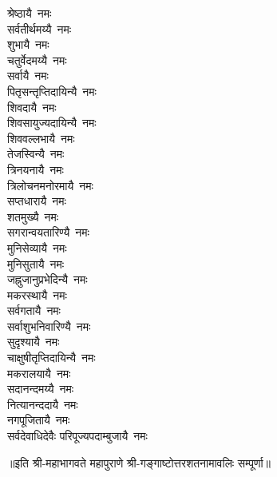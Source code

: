 \begin{multicols}{2}
\begin{flushleft}
श्रेष्ठायै~नमः\\
सर्वतीर्थमय्यै~नमः\\
शुभायै~नमः\\
चतुर्वेदमय्यै~नमः\\
सर्वायै~नमः\\
पितृसन्तृप्तिदायिन्यै~नमः\\
शिवदायै~नमः\\
शिवसायुज्यदायिन्यै~नमः\\
शिववल्लभायै~नमः\\
तेजस्विन्यै~नमः\hfill{}\\
त्रिनयनायै~नमः\\
त्रिलोचनमनोरमायै~नमः\\
सप्तधारायै~नमः\\
शतमुख्यै~नमः\\
सगरान्वयतारिण्यै~नमः\\
मुनिसेव्यायै~नमः\\
मुनिसुतायै~नमः\\
जह्नुजानुप्रभेदिन्यै~नमः\\
मकरस्थायै~नमः\\
सर्वगतायै~नमः\hfill{}\\
सर्वाशुभनिवारिण्यै~नमः\\
सुदृश्यायै~नमः\\
चाक्षुषीतृप्तिदायिन्यै~नमः\\
मकरालयायै~नमः\\
सदानन्दमय्यै~नमः\\
नित्यानन्ददायै~नमः\\
नगपूजितायै~नमः\\
सर्वदेवाधिदेवैः परिपूज्यपदाम्बुजायै~नमः\\
\end{flushleft}
\end{multicols}
॥इति श्री-महाभागवते महापुराणे श्री-गङ्गाष्टोत्तरशतनामावलिः सम्पूर्णा॥
